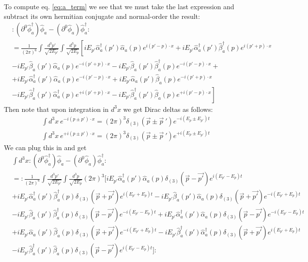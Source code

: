 To compute eq. \eqref{eq:a_term} we see that we must take the last expression and subtract its own hermitian conjugate and normal-order the result:
\begin{align*}
&:(\partial^0 \hat{\phi}_a^\dagger)\hat{\phi}_a-(\partial^0 \hat{\phi}_a)\hat{\phi}_a^\dagger:  \\ 
&= \frac{1}{(2\pi)^6} \int \frac{d^3 p'}{\sqrt{2E_{p'}}} \int \frac{d^3 p}{\sqrt{2E_p}} \left[ iE_{p'} \hat{\alpha}_a^\dagger (p') \hat{\alpha}_a (p) e^{i(p' - p) \cdot x} +  iE_{p'} \hat{\alpha}_a^\dagger (p') \hat{\beta}_a^\dagger (p) e^{i(p' + p) \cdot x} \right .\\
& - iE_{p'} \hat{\beta}_a (p') \hat{\alpha}_a (p) e^{-i(p' + p) \cdot x} - iE_{p'} \hat{\beta}_a (p') \hat{\beta}_a^\dagger (p) e^{-i(p' - p) \cdot x} 
+\\
&+iE_{p'} \hat{\alpha}_a^\dagger (p') \hat{\alpha}_a (p) e^{-i(p' - p) \cdot x} +  iE_{p'} \hat{\alpha}_a (p') \hat{\beta}_a (p) e^{-i(p' + p) \cdot x}  \\
&  - \left .iE_{p'} \hat{\beta}_a^\dagger (p') \hat{\alpha}_a^\dagger (p) e^{+i(p' + p) \cdot x} - iE_{p'} \hat{\beta}_a^\dagger (p') \hat{\beta}_a (p) e^{+i(p' - p) \cdot x} 
\right]
\end{align*}
Then note that upon integration in $d^3 x$ we get Dirac deltas as follows:
\begin{equation}
\begin{split}
    \int d^3 x ~ e^{-i(p\pm p')\cdot x} = (2\pi)^3 \delta_{(3)}(\vec p\pm {\vec p}~') e^{-i (E_p\pm E_{p'})t}\\
    \int d^3 x ~ e^{+i(p\pm p')\cdot x} = (2\pi)^3 \delta_{(3)}(\vec p\pm {\vec p}~') e^{+i (E_p\pm E_{p'})t}
\end{split}
\end{equation}
We can plug this in and get
\begin{align*}
&\int d^3 x:(\partial^0 \hat{\phi}_a^\dagger)\hat{\phi}_a-(\partial^0 \hat{\phi}_a)\hat{\phi}_a^\dagger:  \\ 
&= :\frac{1}{(2\pi)^6} \int \frac{d^3 p'}{\sqrt{2E_{p'}}} \int \frac{d^3 p}{\sqrt{2E_p}} (2\pi)^3 \Bigg[ iE_{p'} \hat{\alpha}_a^\dagger (p') \hat{\alpha}_a (p)   \delta_{(3)}(\vec{p} - \vec{p'}) e^{i(E_{p'} - E_p)t} \\
&+  iE_{p'} \hat{\alpha}_a^\dagger (p') \hat{\beta}_a^\dagger (p)   \delta_{(3)}(\vec{p} + \vec{p'}) e^{i(E_{p'} + E_p)t} - iE_{p'} \hat{\beta}_a (p') \hat{\alpha}_a (p)   \delta_{(3)}(\vec{p} + \vec{p'}) e^{-i(E_{p'} + E_p)t} \\
&- iE_{p'} \hat{\beta}_a (p') \hat{\beta}_a^\dagger (p)   \delta_{(3)}(\vec{p} - \vec{p'}) e^{-i(E_{p'} - E_p)t} + iE_{p'} \hat{\alpha}_a^\dagger (p') \hat{\alpha}_a (p)   \delta_{(3)}(\vec{p} - \vec{p'}) e^{-i(E_{p'} - E_p)t} \\
&+ iE_{p'} \hat{\alpha}_a (p') \hat{\beta}_a (p)   \delta_{(3)}(\vec{p} + \vec{p'}) e^{-i(E_{p'} + E_p)t} - iE_{p'} \hat{\beta}_a^\dagger (p') \hat{\alpha}_a^\dagger (p)   \delta_{(3)}(\vec{p} + \vec{p'}) e^{i(E_{p'} + E_p)t} \\
&- iE_{p'} \hat{\beta}_a^\dagger (p') \hat{\beta}_a (p)   \delta_{(3)}(\vec{p} - \vec{p'}) e^{i(E_{p'} - E_p)t} \Bigg]:
\end{align*}
